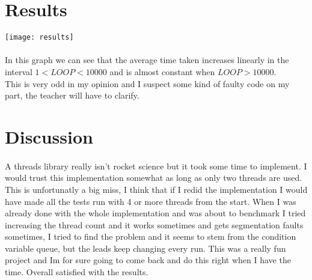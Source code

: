 \documentclass[11pt]{article}
\begin{document}
\section{Results}

\texttt{[image: results]} \\

\paragraph{}
In this graph we can see that the average time taken increases linearly in the interval $1<LOOP<10000$ and is almost constant when $LOOP>10000$. \\
This is very odd in my opinion and I suspect some kind of faulty code on my part, the teacher will have to clarify.

\section{Discussion}

\paragraph{}
A threads library really isn't rocket science but it took some time to implement. I would trust this implementation somewhat as long as only two threads
are used. This is unfortunatly a big miss, I think that if I redid the implementation I would have made all the tests run with 4 or more threads from 
the start. When I was already done with the whole implementation and was about to benchmark I tried increasing the thread count and it works sometimes
and gets segmentation faults sometimes, I tried to find the problem and it seems to stem from the condition variable queue, but the leads keep changing 
every run. This was a really fun project and Im for sure going to come back and do this right when I have the time. Overall satisfied with the results.
\end{document}
